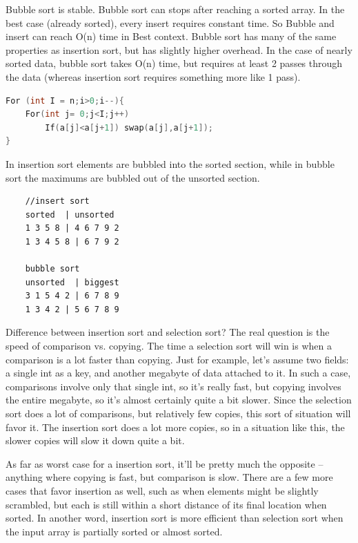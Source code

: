 \documentclass[a4paper,11pt,twoside]{book}
\begin{document}
	\par Bubble sort is stable. Bubble sort can stops after reaching a sorted array. In the best case (already sorted), every insert requires constant time. So Bubble and insert can reach O(n) time in Best context. Bubble sort has many of the same properties as insertion sort, but has slightly higher overhead. In the case of nearly sorted data, bubble sort takes O(n) time, but requires at least 2 passes through the data (whereas insertion sort requires something more like 1 pass).
\begin{lstlisting}[frame=single, language=c++]
For (int I = n;i>0;i--){
	For(int j= 0;j<I;j++)
		If(a[j]<a[j+1]) swap(a[j],a[j+1]);
}
\end{lstlisting}


	\par In insertion sort elements are bubbled into the sorted section, while in bubble sort the maximums are bubbled out of the unsorted section.

\begin{lstlisting}
	//insert sort
	sorted  | unsorted
	1 3 5 8 | 4 6 7 9 2
	1 3 4 5 8 | 6 7 9 2
	
	bubble sort
	unsorted  | biggest
	3 1 5 4 2 | 6 7 8 9
	1 3 4 2 | 5 6 7 8 9
\end{lstlisting}

\par Difference between insertion sort and selection sort? The real question is the speed of comparison vs. copying. The time a selection sort will win is when a comparison is a lot faster than copying. Just for example, let's assume two fields: a single int as a key, and another megabyte of data attached to it. In such a case, comparisons involve only that single int, so it's really fast, but copying involves the entire megabyte, so it's almost certainly quite a bit slower. Since the selection sort does a lot of comparisons, but relatively few copies, this sort of situation will favor it. The insertion sort does a lot more copies, so in a situation like this, the slower copies will slow it down quite a bit.

\par As far as worst case for a insertion sort, it'll be pretty much the opposite -- anything where copying is fast, but comparison is slow. There are a few more cases that favor insertion as well, such as when elements might be slightly scrambled, but each is still within a short distance of its final location when sorted. In another word, insertion sort is more efficient than selection sort when the input array is partially sorted or almost sorted.
\end{document}
